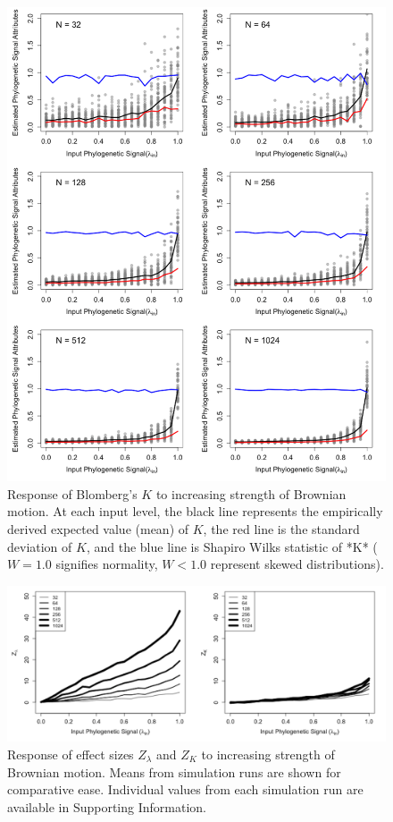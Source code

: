 \documentclass[
]{article}
\begin{document}
\begin{figure}
\includegraphics[width=1\linewidth]{Figs/fig.2} \caption{Response of Blomberg's $K$ to increasing strength of Brownian motion.  At each input level, the black line represents the empirically derived expected value (mean) of $K$, the red line is the standard deviation of $K$, and the blue line is Shapiro Wilks statistic of *K* ($W=1.0$ signifies normality, $W< 1.0$ represent skewed distributions).}\label{fig:unnamed-chunk-4}
\end{figure}

\begin{figure}
\includegraphics[width=1\linewidth]{Figs/fig.3} \caption{Response of effect sizes $Z_\lambda$ and $Z_K$ to increasing strength of Brownian motion.  Means from simulation runs are shown for comparative ease. Individual values from each simulation run are available in Supporting Information.}\label{fig:unnamed-chunk-5}
\end{figure}
\end{document}
